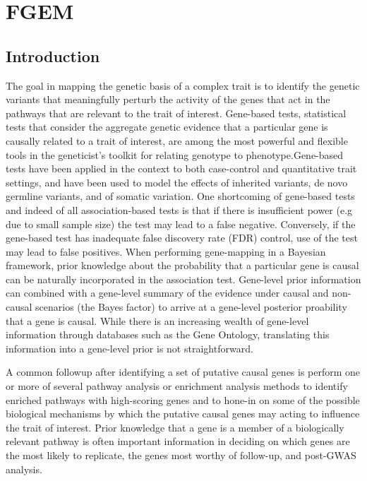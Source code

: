 
\chapter{FGEM}




\section{Introduction}\label{sec:org28fe636}

The goal in mapping the genetic basis of a complex trait is to identify the genetic variants that meaningfully perturb the activity of the genes that act in the pathways that are relevant to the trait of interest.  Gene-based tests, statistical tests that consider the aggregate genetic evidence that a particular gene is causally related to a trait of interest, are among the most powerful and flexible tools in the geneticist's toolkit for relating genotype to phenotype.Gene-based tests have been applied in the context to both case-control\cite{skat} and  quantitative trait settings\cite{predixcan}, and have been used to model the effects of inherited variants\cite{skat}, de novo germline variants\cite{TADA}, and of somatic variation\cite{drivermaps}.  One shortcoming of gene-based tests and indeed of all association-based tests is that if there is insufficient power (e.g due to small sample size) the test may lead to a false negative.  Conversely, if the gene-based test has inadequate false discovery rate (FDR) control, use of the test may lead to false positives. When performing gene-mapping in a Bayesian framework, prior knowledge about the probability that a particular gene is causal can be naturally incorporated in the association test.  Gene-level prior information can combined with a gene-level summary of the evidence under causal and non-causal scenarios (the Bayes factor) to arrive at a gene-level posterior proability that a gene is causal.  While there is an increasing wealth of gene-level information through databases such as the Gene Ontology\cite{GO}, translating this information into a gene-level prior is not straightforward.

A common followup after identifying a set of putative causal genes is perform one or more of several pathway analysis or enrichment analysis methods\cite{rss-e}\cite{Carbonetto_2013}\cite{Lamparter_2016} to identify enriched pathways with high-scoring genes and to hone-in on some of the possible biological mechanisms by which the putative causal genes may acting to influence the trait of interest. Prior knowledge that a gene is a member of a biologically relevant pathway is often important information in deciding on which genes are the most likely to replicate, the genes most worthy of follow-up, and post-GWAS analysis\cite{Hou_2013}.

